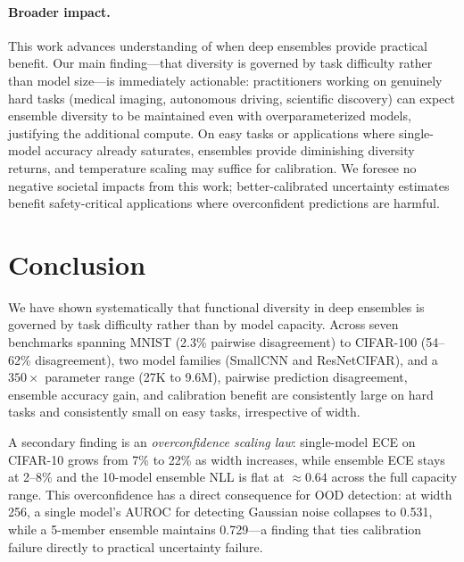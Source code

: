 \documentclass[11pt]{article}
\begin{document}
\paragraph{Broader impact.}
This work advances understanding of when deep ensembles provide practical
benefit.  Our main finding---that diversity is governed by task difficulty
rather than model size---is immediately actionable: practitioners working
on genuinely hard tasks (medical imaging, autonomous driving, scientific
discovery) can expect ensemble diversity to be maintained even with
overparameterized models, justifying the additional compute.  On easy tasks
or applications where single-model accuracy already saturates, ensembles
provide diminishing diversity returns, and temperature scaling may suffice
for calibration.  We foresee no negative societal impacts from this work;
better-calibrated uncertainty estimates benefit safety-critical applications
where overconfident predictions are harmful.

\section{Conclusion}
\label{sec:conclusion}

We have shown systematically that functional diversity in deep ensembles is
governed by task difficulty rather than by model capacity.  Across seven
benchmarks spanning MNIST (2.3\% pairwise disagreement) to CIFAR-100
(54--62\% disagreement), two model families (SmallCNN and ResNetCIFAR),
and a $350\times$ parameter range (27K to 9.6M), pairwise prediction disagreement,
ensemble accuracy gain, and calibration benefit are consistently large on
hard tasks and consistently small on easy tasks, irrespective of width.

A secondary finding is an \emph{overconfidence scaling law}: single-model
ECE on CIFAR-10 grows from 7\% to 22\% as width increases, while
ensemble ECE stays at 2--8\% and the 10-model ensemble NLL is flat
at ${\approx}0.64$ across the full capacity range.  This overconfidence
has a direct consequence for OOD detection: at width 256, a single
model's AUROC for detecting Gaussian noise collapses to 0.531, while
a 5-member ensemble maintains 0.729---a finding that ties calibration
failure directly to practical uncertainty failure.
\end{document}
